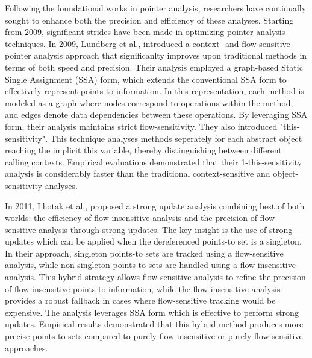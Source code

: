 Following the foundational works in pointer analysis, researchers have continually sought to enhance both the precision and efficiency of these analyses.
Starting from 2009, significant strides have been made in optimizing pointer analysis techniques.
In 2009, Lundberg et al., \cite{lundberg2009fast} introduced a context- and flow-sensitive pointer analysis approach that significanlty improves upon traditional methods in terms of both speed and precision.
Their analysis employed a graph-based Static Single Assignment (SSA) form, which extends the conventional SSA form \cite{ssa} to effectively represent points-to information.
In this representation, each method is modeled as a graph where nodes correspond to operations within the method, and edges denote data dependencies between these operations.
By leveraging SSA form, their analysis maintains strict flow-sensitivity.
They also introduced "this-sensitivity". This technique analyses methods seperately for each abstract object reaching the implicit this variable, thereby distinguishing between different calling contexts.
Empirical evaluations demonstrated that their 1-this-sensitivity analysis is considerably faster than the traditional context-sensitive and object-sensitivity analyses.

In 2011, Lhotak et al., \cite{lhotak2011points} proposed a strong update analysis combining best of both worlds: the efficiency of flow-insensitive analysis and the precision of flow-sensitive analysis through strong updates.
The key insight is the use of strong updates which can be applied when the dereferenced points-to set is a singleton. 
In their approach, singleton points-to sets are tracked using a flow-sensitive analysis, while non-singleton points-to sets are handled using a flow-insensitive analysis.
This hybrid strategy allows flow-sensitive analysis to refine the precision of flow-insensitive points-to information, while the flow-insensitive analysis provides a robust fallback in cases where flow-sensitive tracking would be expensive.
The analysis leverages SSA form which is effective to perform strong updates. Empirical results demonstrated that this hybrid method produces more precise points-to sets compared to purely flow-insensitive or purely flow-sensitive approaches.